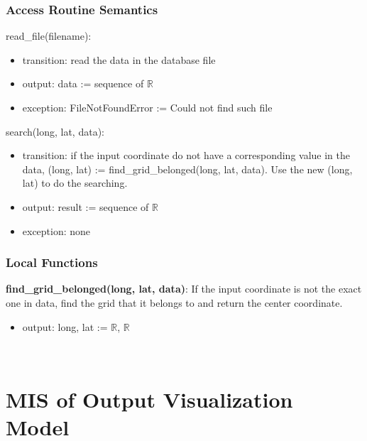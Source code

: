\documentclass[12pt, titlepage]{article}
\begin{document}
\subsubsection{Access Routine Semantics}
\noindent read\_file(filename):
\begin{itemize}
\item transition: read the data in the database file
\item output: data := sequence of $\mathbb{R}$
\item exception: FileNotFoundError := Could not find such file
\end{itemize}
\noindent search(long, lat, data):
\begin{itemize}
\item transition: if the input coordinate do not have a corresponding value in the data, (long, lat) := find\_grid\_belonged(long, lat, data). Use the new (long, lat) to do the searching.
\item output: result := sequence of $\mathbb{R}$
\item exception: none
\end{itemize}



\subsubsection{Local Functions}
\noindent \textbf{find\_grid\_belonged(long, lat, data)}: If the input coordinate is not the exact one in data, find the grid that it belongs to and return the center coordinate.
\begin{itemize}
\item output: long, lat := $\mathbb{R}$, $\mathbb{R}$

\end{itemize}

 

~\newpage

\section{MIS of Output Visualization Model} \label{outputVisualizationModule} 
\end{document}
